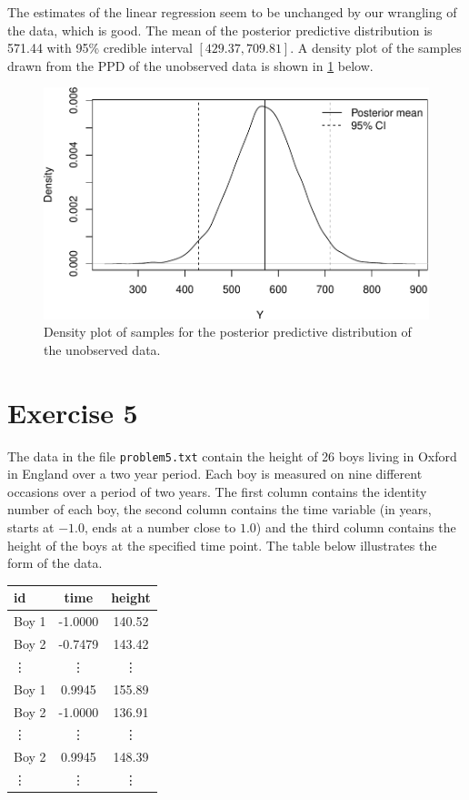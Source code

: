 \documentclass[
]{homework}
\begin{document}
The estimates of the linear regression seem to be unchanged by our wrangling of the data, which is good. The mean of the posterior predictive distribution is 571.44 with 95\% credible interval \([429.37, 709.81]\).
A density plot of the samples drawn from the PPD of the unobserved data is shown in \ref{fig:ex4-fig-density} below.

\begin{figure}

{\centering \includegraphics[width=0.75\linewidth]{finalexam_files/figure-latex/ex4-fig-density-1} 

}

\caption{Density plot of samples for the posterior predictive distribution of the unobserved data.}\label{fig:ex4-fig-density}
\end{figure}

\newpage

\section{Exercise 5}\label{exercise-5}

The data in the file \texttt{problem5.txt} contain the height of 26 boys living in Oxford in England over a two year period. Each boy is measured on nine different occasions over a period
of two years. The first column contains the identity number of each boy, the second column contains the time variable (in years, starts at \(-1.0\), ends at a number close to \(1.0\))
and the third column contains the height of the boys at the specified time point. The table below illustrates the form of the data.

\begin{table}[H]
  \centering
  \begin{tabular}{lcc}
    \toprule
    id & time & height \\
    \midrule
    Boy 1  & -1.0000 & 140.52 \\
    Boy 2  & -0.7479 & 143.42 \\
    \vdots &  \vdots & \vdots \\
    Boy 1  &  0.9945& 155.89 \\
    Boy 2  & -1.0000 & 136.91 \\
    \vdots &  \vdots & \vdots \\
    Boy 2  &  0.9945 & 148.39 \\
    \vdots &  \vdots & \vdots \\
    \bottomrule
  \end{tabular}
\end{table}
\end{document}
